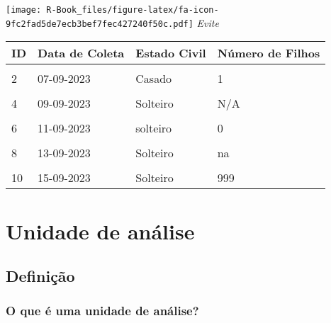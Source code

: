 \documentclass[
]{book}
\begin{document}
\texttt{[image: R-Book\_files/figure-latex/fa-icon-9fc2fad5de7ecb3bef7fec427240f50c.pdf]} \emph{Evite}

\begin{tabu} to 
\toprule
\textbf{ID} & \textbf{Data de Coleta} & \textbf{Estado Civil} & \textbf{Número de Filhos}\\
\midrule
{} &  &  & \\
2 & 07-09-2023 & Casado & 1\\
 &  &  & \\
4 & 09-09-2023 & Solteiro & N/A\\
 &  &  & \\
6 & 11-09-2023 & solteiro & 0\\
 &  &  & \\
8 & 13-09-2023 & Solteiro & na\\
 &  &  & \\
10 & 15-09-2023 & Solteiro & 999\\
\bottomrule
\end{tabu}

\hypertarget{unidade-analise}{%
\chapter{\texorpdfstring{\textbf{Unidade de análise}}{Unidade de análise}}\label{unidade-analise}}

\hypertarget{definicao}{%
\section{Definição}\label{definicao}}

\hypertarget{o-que-uxe9-uma-unidade-de-anuxe1lise}{%
\subsection{O que é uma unidade de análise?}\label{o-que-uxe9-uma-unidade-de-anuxe1lise}}
\end{document}
